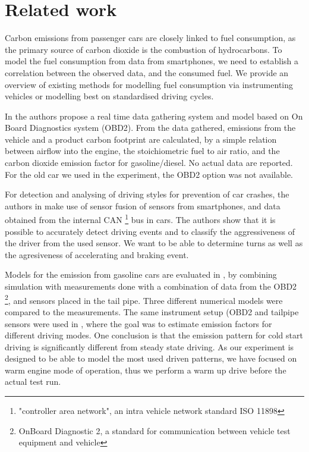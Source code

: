 \section{Related work}

 Carbon emissions from passenger cars are closely linked to fuel consumption, as the primary source of carbon dioxide is the combustion of hydrocarbons. To model the fuel consumption from  data from smartphones, we need to establish a correlation between the observed data, and the consumed fuel. We provide an overview of existing methods for modelling fuel consumption via instrumenting vehicles or modelling best on standardised driving cycles.

In \cite{hilpert201} the authors propose a real time data gathering system and model based on On Board Diagnostics system (OBD2). From the data gathered, emissions from the vehicle and a product carbon footprint are calculated, by a simple relation between airflow into the engine, the stoichiometric fuel to air ratio, and the carbon dioxide emission factor for gasoline/diesel. No actual data are reported. For the old car we used in the experiment, the OBD2 option was not available. 

For detection and analysing of driving styles for prevention of car crashes, the authors in \cite{Johnson2011} make use of sensor fusion of sensors from smartphones, and data obtained from the internal CAN \footnote{"controller area network", an intra vehicle network standard ISO 11898} bus in cars. The authors show that it is possible to accurately detect driving events and to classify the aggressiveness of the driver from the used sensor. We want to be able to determine turns as well as the agresiveness of accelerating and braking event.

Models for the emission from gasoline cars are evaluated in \cite{Silva2006}, by combining simulation with measurements done with a combination of data from the OBD2 \footnote{OnBoard Diagnostic 2, a standard for communication between vehicle test equipment and vehicle}, and sensors placed in the tail pipe. Three different numerical models were compared to the measurements. The same instrument setup (OBD2 and tailpipe sensors were used in \cite{Frey}, where the goal was to estimate emission factors for different driving modes. One conclusion is that the emission pattern for cold start driving is significantly different from steady state driving. As our experiment is designed to be able to model the most used driven patterns, we have focused on warm engine mode of operation, thus we perform a warm up drive before the actual test run.

